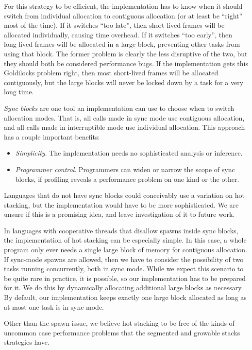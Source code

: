 \documentclass[a4paper,UKenglish,cleveref, autoref]{lipics-v2019}
\begin{document}
For this strategy to be efficient, the implementation has to know when it should switch from individual allocation to contiguous allocation (or at least be ``right'' most of the time).
If it switches ``too late'', then short-lived frames will be allocated individually, causing time overhead.
If it switches ``too early'', then long-lived frames will be allocated in a large block, preventing other tasks from using that block.
The former problem is clearly the less disruptive of the two, but they should both be considered performance bugs.
If the implementation gets this Goldilocks problem right, then most short-lived frames will be allocated contiguously, but the large blocks will never be locked down by a task for a very long time.

\emph{Sync blocks} are one tool an implementation can use to choose when to switch allocation modes.
That is, all calls made in sync mode use contiguous allocation, and all calls made in interruptible mode use individual allocation.
This approach has a couple important benefits:
\begin{itemize}
\item \emph{Simplicity}.
  The implementation needs no sophisticated analysis or inference.
\item \emph{Programmer control}.
  Programmers can widen or narrow the scope of sync blocks, if profiling reveals a performance problem on one kind or the other.
\end{itemize}

Languages that do not have sync blocks could conceivably use a variation on hot stacking, but the implementation would have to be more sophisticated.
We are unsure if this is a promising idea, and leave investigation of it to future work.

In languages with cooperative threads that disallow spawns inside sync blocks, the implementation of hot stacking can be especially simple.
In this case, a whole program only ever needs a single large block of memory for contiguous allocation.
If sync-mode spawns are allowed, then we have to consider the possibility of two tasks running concurrently, both in sync mode.
While we expect this scenario to be quite rare in practice, it is possible, so our implementation has to be prepared for it.
We do this by dynamically allocating additional large blocks as necessary.
By default, our implementation keeps exactly one large block allocated as long as at most one task is in sync mode.

Other than the spawn issue, we believe hot stacking to be free of the kinds of uncommon case performance problems that the segmented and growable stacks strategies have.
\end{document}
